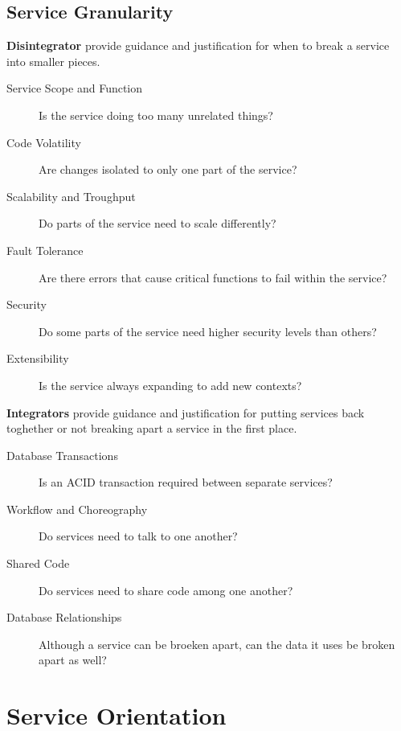 \documentclass[../Main.tex]{subfiles}
\begin{document}
\subsection{Service Granularity}
\begin{multicols}{2}
    \textbf{Disintegrator} provide guidance and justification for when to break a service into smaller pieces.
    \begin{description}
        \item[Service Scope and Function] Is the service doing too many unrelated things?
        \item[Code Volatility] Are changes isolated to only one part of the service?
        \item[Scalability and Troughput] Do parts of the service need to scale differently?
        \item[Fault Tolerance] Are there errors that cause critical functions to fail within the service?
        \item[Security] Do some parts of the service need higher security levels than others?
        \item[Extensibility] Is the service always expanding to add new contexts?   
    \end{description}
    \columnbreak
    \textbf{Integrators} provide guidance and justification for putting services back  toghether or not breaking apart a service in the first place.
    \begin{description}
        \item[Database Transactions] Is an ACID transaction required between separate services?
        \item[Workflow and Choreography] Do services need to talk to one another?
        \item[Shared Code] Do services need to share code among one another?
        \item[Database Relationships] Although a service can be broeken apart, can the data it uses be broken apart as well?    
    \end{description}
\end{multicols}
\newpage

\section{Service Orientation}
\end{document}
